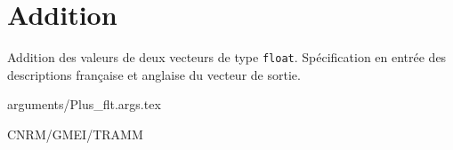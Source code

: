 %
\section{Addition}

 

Addition des valeurs de deux vecteurs de type \texttt{float}.
Sp\'ecification en entr\'ee des descriptions fran\c caise et anglaise du
vecteur de sortie.


\bigskip
 {arguments/Plus_flt.args.tex}




CNRM/GMEI/TRAMM


